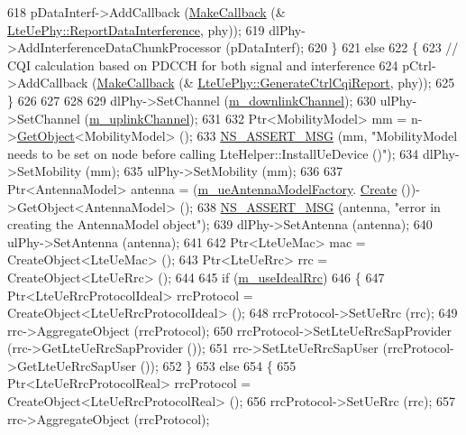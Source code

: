 \begin{DoxyCode}
618       pDataInterf->AddCallback (\hyperlink{group__makecallbackmemptr_ga9376283685aa99d204048d6a4b7610a4}{MakeCallback} (&
      \hyperlink{classns3_1_1LteUePhy_a20cf3a136a19472fdab4ac7bd78f2c22}{LteUePhy::ReportDataInterference}, phy));
619       dlPhy->AddInterferenceDataChunkProcessor (pDataInterf);
620     \}
621   \textcolor{keywordflow}{else}
622     \{
623       \textcolor{comment}{// CQI calculation based on PDCCH for both signal and interference}
624       pCtrl->AddCallback (\hyperlink{group__makecallbackmemptr_ga9376283685aa99d204048d6a4b7610a4}{MakeCallback} (&
      \hyperlink{classns3_1_1LteUePhy_a7eb062ce376b91b78d2bcfec9119c228}{LteUePhy::GenerateCtrlCqiReport}, phy));
625     \}
626 
627 
628 
629   dlPhy->SetChannel (\hyperlink{classns3_1_1LteHelper_a5c2237946550d801d80c0d0bee0b4cfb}{m\_downlinkChannel});
630   ulPhy->SetChannel (\hyperlink{classns3_1_1LteHelper_ad61b21e2f55749e680942016b2e57abe}{m\_uplinkChannel});
631 
632   Ptr<MobilityModel> mm = n->\hyperlink{classns3_1_1Object_a13e18c00017096c8381eb651d5bd0783}{GetObject}<MobilityModel> ();
633   \hyperlink{assert_8h_aff5ece9066c74e681e74999856f08539}{NS\_ASSERT\_MSG} (mm, \textcolor{stringliteral}{"MobilityModel needs to be set on node before calling
       LteHelper::InstallUeDevice ()"});
634   dlPhy->SetMobility (mm);
635   ulPhy->SetMobility (mm);
636 
637   Ptr<AntennaModel> antenna = (\hyperlink{classns3_1_1LteHelper_ad53289a5a6b37a2621bcd90562ab7ee4}{m\_ueAntennaModelFactory}.
      \hyperlink{classns3_1_1ObjectFactory_a18152e93f0a6fe184ed7300cb31e9896}{Create} ())->GetObject<AntennaModel> ();
638   \hyperlink{assert_8h_aff5ece9066c74e681e74999856f08539}{NS\_ASSERT\_MSG} (antenna, \textcolor{stringliteral}{"error in creating the AntennaModel object"});
639   dlPhy->SetAntenna (antenna);
640   ulPhy->SetAntenna (antenna);
641 
642   Ptr<LteUeMac> mac = CreateObject<LteUeMac> ();
643   Ptr<LteUeRrc> rrc = CreateObject<LteUeRrc> ();
644 
645   \textcolor{keywordflow}{if} (\hyperlink{classns3_1_1LteHelper_ab230ddf0db292c4ea6482e80bac0d53a}{m\_useIdealRrc})
646     \{
647       Ptr<LteUeRrcProtocolIdeal> rrcProtocol = CreateObject<LteUeRrcProtocolIdeal> ();
648       rrcProtocol->SetUeRrc (rrc);
649       rrc->AggregateObject (rrcProtocol);
650       rrcProtocol->SetLteUeRrcSapProvider (rrc->GetLteUeRrcSapProvider ());
651       rrc->SetLteUeRrcSapUser (rrcProtocol->GetLteUeRrcSapUser ());
652     \}
653   \textcolor{keywordflow}{else}
654     \{
655       Ptr<LteUeRrcProtocolReal> rrcProtocol = CreateObject<LteUeRrcProtocolReal> ();
656       rrcProtocol->SetUeRrc (rrc);
657       rrc->AggregateObject (rrcProtocol);

\end{DoxyCode}
